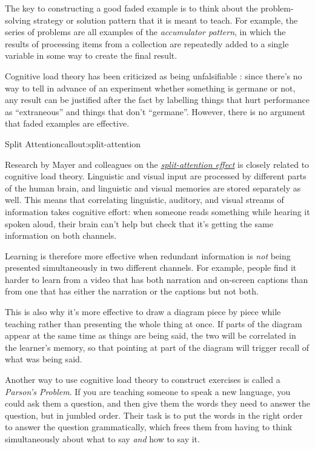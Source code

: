 The key to constructing a good faded example is to think about the
problem-solving strategy or solution pattern that it is meant to
teach.  For example, the series of problems are all examples of the
\emph{accumulator pattern}, in which the results of processing items
from a collection are repeatedly added to a single variable in some way
to create the final result.

Cognitive load theory has been criticized as being unfalsifiable
\cite{fixme}: since there's no way to tell in advance of
an experiment whether something is germane or not, any result can be
justified after the fact by labelling things that hurt performance as
``extraneous'' and things that don't ``germane''.  However, there is
no argument that faded examples are effective.

\begin{callout}{Split Attention}{callout:split-attention}

Research by Mayer and colleagues on the
\emph{\href{https://en.wikipedia.org/wiki/Split\_attention\_effect}{split-attention
effect}} is closely related to cognitive load theory.  Linguistic and
visual input are processed by different parts of the human brain, and
linguistic and visual memories are stored separately as well. This
means that correlating linguistic, auditory, and visual streams of
information takes cognitive effort: when someone reads something while
hearing it spoken aloud, their brain can't help but check that it's
getting the same information on both channels.

Learning is therefore more effective when redundant information is
\emph{not} being presented simultaneously in two different channels. For
example, people find it harder to learn from a video that has both
narration and on-screen captions than from one that has either the
narration or the captions but not both.

This is also why it's more effective to draw a diagram piece by piece
while teaching rather than presenting the whole thing at once.  If
parts of the diagram appear at the same time as things are being said,
the two will be correlated in the learner's memory, so that pointing
at part of the diagram will trigger recall of what was being said.

\end{callout}

Another way to use cognitive load theory to construct exercises is
called a \emph{Parson's Problem}.  If you are teaching someone to
speak a new language, you could ask them a question, and then give
them the words they need to answer the question, but in jumbled
order.  Their task is to put the words in the right order to answer
the question grammatically, which frees them from having to think
simultaneously about what to say \emph{and} how to say it.

